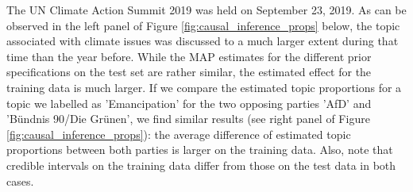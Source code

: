 The UN Climate Action Summit 2019 was held on September 23, 2019. As can be observed in the left panel of Figure \ref{fig:causal_inference_props} below, the topic associated with climate issues was discussed to a much larger extent during that time than the year before. While the MAP estimates for the different prior specifications on the test set are rather similar, the estimated effect for the training data is much larger. If we compare the estimated topic proportions for a topic we labelled as 'Emancipation' for the two opposing parties 'AfD' and 'B{\"u}ndnis 90/Die Gr{\"u}nen', we find similar results (see right panel of Figure \ref{fig:causal_inference_props}): the average difference of estimated topic proportions between both parties is larger on the training data. Also, note that credible intervals on the training data differ from those on the test data in both cases.

